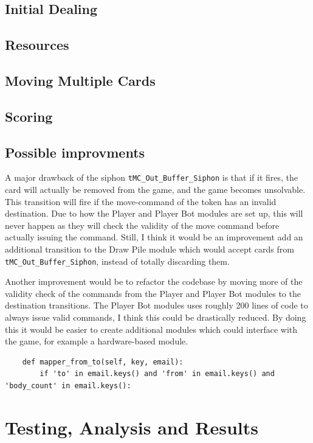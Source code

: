 \documentclass[runningheads,a4paper]{llncs}
\begin{document}
\subsection{Initial Dealing}
\subsection{Resources}
\label{sec:3_Resources}
\subsection{Moving Multiple Cards}
\subsection{Scoring}
\subsection{Possible improvments}
A major drawback of the siphon \verb!tMC_Out_Buffer_Siphon! is that if it fires, the card will actually be removed from the game, and the game becomes unsolvable. This transition will fire if the move-command of the token has an invalid destination. Due to how the Player and Player Bot modules are set up, this will never happen as they will check the validity of the move command before actually issuing the command. Still, I think it would be an improvement add an additional transition to the Draw Pile module which would accept cards from \verb!tMC_Out_Buffer_Siphon!, instead of totally discarding them.
\newline

Another improvement would be to refactor the codebase by moving more of the validity check of the commands from the Player and Player Bot modules to the destination transitions. The Player Bot modules uses roughly 200 lines of code to always issue valid commands, I think this could be drastically reduced. By doing this it would be easier to create additional modules which could interface with the game, for example a hardware-based module.

\begin{verbatim}
    def mapper_from_to(self, key, email):
        if 'to' in email.keys() and 'from' in email.keys() and 'body_count' in email.keys():
\end{verbatim}

\section{Testing, Analysis and Results}
\label{sec:3_testing_analysis}
\end{document}
